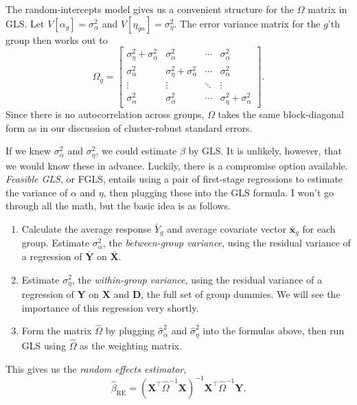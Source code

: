 \documentclass[12pt,oneside,openany]{book}
\begin{document}
The random-intercepts model gives us a convenient structure for the
\(\Omega\) matrix in GLS. Let \(V[\alpha_g] = \sigma^2_\alpha\) and
\(V[\eta_{gn}] = \sigma^2_\eta\). The error variance matrix for the
\(g\)'th group then works out to \[
\Omega_g = \begin{bmatrix}
\sigma_{\eta}^2 + \sigma_{\alpha}^2 & \sigma_{\alpha}^2 & \cdots & \sigma_{\alpha}^2 \\
\sigma_{\alpha}^2 & \sigma_{\eta}^2 + \sigma_{\alpha}^2 & \cdots & \sigma_{\alpha}^2 \\
\vdots & \vdots & \ddots & \vdots \\
\sigma_{\alpha}^2 & \sigma_{\alpha}^2 & \cdots & \sigma_{\eta}^2 + \sigma_{\alpha}^2
\end{bmatrix}.
\] Since there is no autocorrelation across groups, \(\Omega\) takes the
same block-diagonal form as in our discussion of cluster-robust standard
errors.

If we knew \(\sigma^2_\alpha\) and \(\sigma^2_\eta\), we could estimate
\(\beta\) by GLS. It is unlikely, however, that we would know these in
advance. Luckily, there is a compromise option available. \emph{Feasible
GLS}, or FGLS, entails using a pair of first-stage regressions to
estimate the variance of \(\alpha\) and \(\eta\), then plugging these
into the GLS formula. I won't go through all the math, but the basic
idea is as follows.

\begin{enumerate}
\def\labelenumi{\arabic{enumi}.}
\item
  Calculate the average response \(\bar{Y}_g\) and average covariate
  vector \(\bar{\mathbf{x}}_g\) for each group. Estimate
  \(\sigma^2_\alpha\), the \emph{between-group variance}, using the
  residual variance of a regression of \(\bar{\mathbf{Y}}\) on
  \(\bar{\mathbf{X}}\).
\item
  Estimate \(\sigma^2_\eta\), the \emph{within-group variance}, using
  the residual variance of a regression of \(\mathbf{Y}\) on
  \(\mathbf{X}\) and \(\mathbf{D}\), the full set of group dummies. We
  will see the importance of this regression very shortly.
\item
  Form the matrix \(\hat{\Omega}\) by plugging \(\hat{\sigma}^2_\alpha\)
  and \(\hat{\sigma}^2_\eta\) into the formulas above, then run GLS
  using \(\hat{\Omega}\) as the weighting matrix.
\end{enumerate}

This gives us the \emph{random effects estimator}, \[
\hat{\beta}_{\text{RE}} = (\mathbf{X}^\top \hat{\Omega}^{-1} \mathbf{X})^{-1} \mathbf{X}^\top \hat{\Omega}^{-1} \mathbf{Y}.
\]
\end{document}
